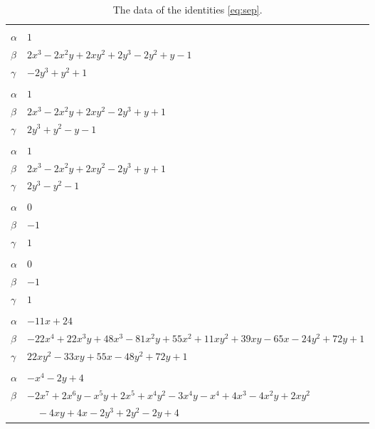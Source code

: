 \documentclass[11pt]{article}
\begin{document}
\begingroup\footnotesize
\setlength{\LTcapwidth}{\textwidth}
\begin{longtable}{@{}ll@{}}
\caption{The data of the identities \eqref{eq:sep}.}\label{tab:sep}\\
\hline\endfirsthead\hline\endhead\hline\endfoot
\multicolumn{2}{@{}l}{$\{i,j\}=\{0,1\}$, $k_{ij}=3$}\\
$\alpha$ & $1$\\
$\beta$ & $2x^{3}-2x^{2}y+2xy^{2}+2y^{3}-2y^{2}+y-1$\\
$\gamma$ & $-2y^{3}+y^{2}+1$\\
\addlinespace[3pt]
\multicolumn{2}{@{}l}{$\{i,j\}=\{0,2\}$, $k_{ij}=2$}\\
$\alpha$ & $1$\\
$\beta$ & $2x^{3}-2x^{2}y+2xy^{2}-2y^{3}+y+1$\\
$\gamma$ & $2y^{3}+y^{2}-y-1$\\
\addlinespace[3pt]
\multicolumn{2}{@{}l}{$\{i,j\}=\{0,3\}$, $k_{ij}=3$}\\
$\alpha$ & $1$\\
$\beta$ & $2x^{3}-2x^{2}y+2xy^{2}-2y^{3}+y+1$\\
$\gamma$ & $2y^{3}-y^{2}-1$\\
\addlinespace[3pt]
\multicolumn{2}{@{}l}{$\{i,j\}=\{0,7\}$, $k_{ij}=1$}\\
$\alpha$ & $0$\\
$\beta$ & $-1$\\
$\gamma$ & $1$\\
\addlinespace[3pt]
\multicolumn{2}{@{}l}{$\{i,j\}=\{0,13\}$, $k_{ij}=2$}\\
$\alpha$ & $0$\\
$\beta$ & $-1$\\
$\gamma$ & $1$\\
\addlinespace[3pt]
\multicolumn{2}{@{}l}{$\{i,j\}=\{0,19\}$, $k_{ij}=2^{4}\cdot 3$}\\
$\alpha$ & $-11x+24$\\
$\beta$ & $-22x^{4}+22x^{3}y+48x^{3}-81x^{2}y+55x^{2}+11xy^{2}+39xy-65x-24y^{2}+72y+1$\\
$\gamma$ & $22xy^{2}-33xy+55x-48y^{2}+72y+1$\\
\addlinespace[3pt]
\multicolumn{2}{@{}l}{$\{i,j\}=\{0,20\}$, $k_{ij}=2^{2}$}\\
$\alpha$ & $-x^{4}-2y+4$\\
$\beta$ & $-2x^{7}+2x^{6}y-x^{5}y+2x^{5}+x^{4}y^{2}-3x^{4}y-x^{4}+4x^{3}-4x^{2}y+2xy^{2}$\\
 & $\quad -4xy+4x-2y^{3}+2y^{2}-2y+4$\\

\end{longtable}
\end{document}
